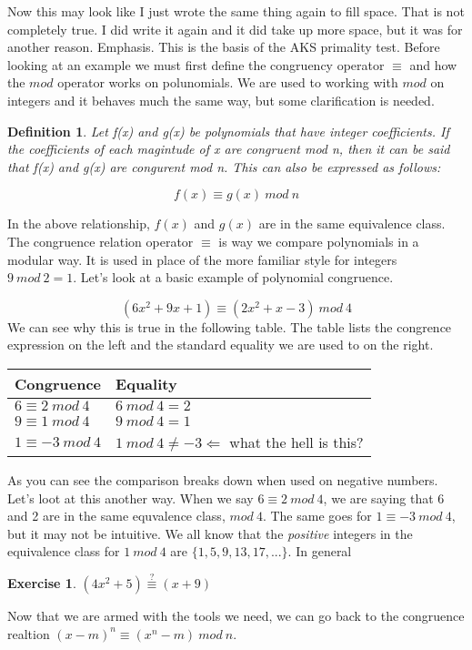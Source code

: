 \documentclass[11pt]{article}
\newtheorem{ex}{Exercise}
\newtheorem{definition}{Definition}
\begin{document}
Now this may look like I just wrote the same thing again to fill space. That is not completely true. I did write it again and it did take up more space, but it was for another reason. Emphasis. This is the basis of the AKS primality test. Before looking at an example we must first define the congruency operator $\equiv$ and how the $mod$ operator works on polunomials. We are used to working with $mod$ on integers and it behaves much the same way, but some clarification is needed. 


\begin{definition}
Let f(x) and g(x) be polynomials  that have integer coefficients. If the coefficients of each magintude of x are congruent mod n, then it can be said that f(x) and g(x) are congurent mod n. This can also be expressed as follows:

$$f(x) \equiv g(x)\ mod\ n$$
 
\end{definition}

In the above relationship, $f(x)$ and $g(x)$ are in the same equivalence class. The congruence relation operator $\equiv$ is way we compare polynomials in a modular way. It is used in place of the more familiar style for integers $ 9\ mod\ 2 = 1 $. Let's look at a basic example of polynomial congruence.

$$(6x^2+9x+1) \equiv (2x^2+x-3)\ mod\ 4$$ We can see why this is true in the following table. The table lists the congrence expression on the left and the standard equality we are used to on the right. 

\begin{center}
    \begin{tabular}{ | l | l |}
    \hline
	Congruence & Equality \\ \hline
	$ 6 \equiv 2\ mod\ 4 $ & $6\ mod\ 4=2$\\ \hline
	$ 9 \equiv 1\ mod\ 4 $ & $9\ mod\ 4=1$\\ \hline
	$ 1 \equiv -3\ mod\ 4 $ & $1\ mod\ 4\not=-3\Leftarrow$ what the hell is this?\\ \hline
    \end{tabular}
\end{center}

As you can see the comparison breaks down when used on negative numbers. Let's loot at this another way. When we say $6 \equiv 2\ mod\ 4$, we are saying that 6 and 2 are in the same equvalence class, $mod\ 4$. The same goes for $1 \equiv-3\ mod\ 4$, but it may not be intuitive. We all know that the \emph{positive} integers in the equivalence class for $1\ mod\ 4$ are $\{1,5,9,13,17,...\}$. In general 

\begin{ex}
$(4x^2+5) \stackrel{?}{\equiv} (x+9)$
\end{ex}
\vspace{10pc}
Now that we are armed with the tools we need, we can go back to the congruence realtion $(x-m)^n \equiv (x^n -m)\ mod\ n$.
\end{document}
